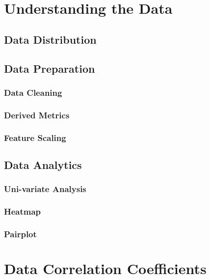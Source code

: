 \documentclass{swfuthesise}
\begin{document}
\section{Understanding the Data}
\lipsum[20]

\subsection{Data Distribution}
\lipsum[21]

\subsection{Data Preparation}
\lipsum[22]

\subsubsection{Data Cleaning}
\lipsum[23]

\subsubsection{Derived Metrics}
\lipsum[24]

\subsubsection{Feature Scaling}
\lipsum[25]

\subsection{Data Analytics}
\lipsum[26]

\subsubsection{Uni-variate Analysis}
\lipsum[27]

\subsubsection{Heatmap}
\lipsum[28]

\subsubsection{Pairplot}
\lipsum[29]

\section{Data Correlation Coefficients}
\lipsum[30]
\end{document}

